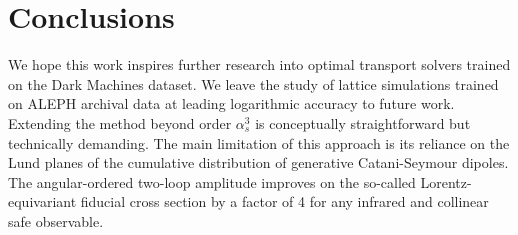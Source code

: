 \section{Conclusions}\label{sec:conclusions}

We hope this work inspires further research into optimal transport
solvers trained on the Dark Machines dataset. We leave the study of
lattice simulations trained on ALEPH archival data at leading
logarithmic accuracy to future work. Extending the method beyond order
$\alpha_s^3$ is conceptually straightforward but technically demanding.
The main limitation of this approach is its reliance on the Lund planes
of the cumulative distribution of generative Catani-Seymour dipoles. The
angular-ordered two-loop amplitude improves on the so-called
Lorentz-equivariant fiducial cross section by a factor of 4 for any
infrared and collinear safe observable.

